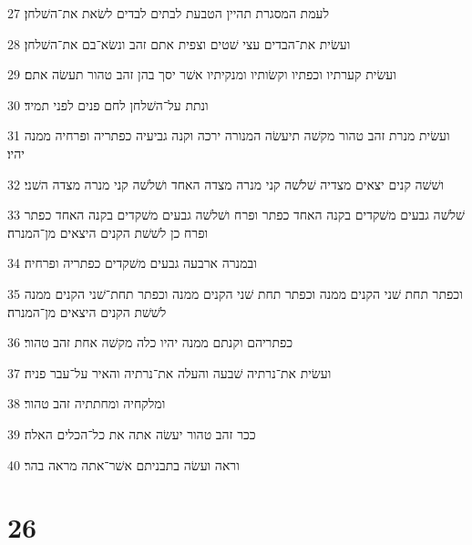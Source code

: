 \par 27 לעמת המסגרת תהיין הטבעת לבתים לבדים לשׂאת את־השׁלחן׃
\par 28 ועשׂית את־הבדים עצי שׁטים וצפית אתם זהב ונשׂא־בם את־השׁלחן׃
\par 29 ועשׂית קערתיו וכפתיו וקשׂותיו ומנקיתיו אשׁר יסך בהן זהב טהור תעשׂה אתם׃
\par 30 ונתת על־השׁלחן לחם פנים לפני תמיד׃
\par 31 ועשׂית מנרת זהב טהור מקשׁה תיעשׂה המנורה ירכה וקנה גביעיה כפתריה ופרחיה ממנה יהיו׃
\par 32 ושׁשׁה קנים יצאים מצדיה שׁלשׁה קני מנרה מצדה האחד ושׁלשׁה קני מנרה מצדה השׁני׃
\par 33 שׁלשׁה גבעים משׁקדים בקנה האחד כפתר ופרח ושׁלשׁה גבעים משׁקדים בקנה האחד כפתר ופרח כן לשׁשׁת הקנים היצאים מן־המנרה׃
\par 34 ובמנרה ארבעה גבעים משׁקדים כפתריה ופרחיה׃
\par 35 וכפתר תחת שׁני הקנים ממנה וכפתר תחת שׁני הקנים ממנה וכפתר תחת־שׁני הקנים ממנה לשׁשׁת הקנים היצאים מן־המנרה׃
\par 36 כפתריהם וקנתם ממנה יהיו כלה מקשׁה אחת זהב טהור׃
\par 37 ועשׂית את־נרתיה שׁבעה והעלה את־נרתיה והאיר על־עבר פניה׃
\par 38 ומלקחיה ומחתתיה זהב טהור׃
\par 39 ככר זהב טהור יעשׂה אתה את כל־הכלים האלה׃
\par 40 וראה ועשׂה בתבניתם אשׁר־אתה מראה בהר׃

\chapter{26}

